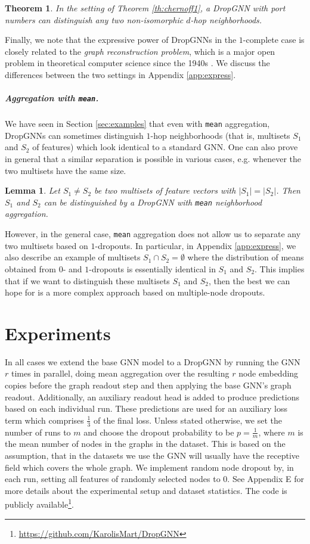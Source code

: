\documentclass{article}
\newtheorem{theorem}{Theorem}
\newtheorem{lemma}{Lemma}
\begin{document}
\begin{theorem} \label{th:ports}
In the setting of Theorem \ref{th:chernoff1}, a DropGNN with port numbers can distinguish any two non-isomorphic $d$-hop neighborhoods.
\end{theorem}

Finally, we note that the expressive power of DropGNNs in the $1$-complete case is closely related to the \textit{graph reconstruction problem}, which is a major open problem in theoretical computer science since the 1940s \citep{reconstruction}. We discuss the differences between the two settings in Appendix \ref{app:express}.

\subparagraph*{Aggregation with \texttt{mean}.} We have seen in Section \ref{sec:examples} that even with \texttt{mean} aggregation, DropGNNs can sometimes distinguish $1$-hop neighborhoods (that is, multisets $S_1$ and $S_2$ of features) which look identical to a standard GNN. One can also prove in general that a similar separation is possible in various cases, e.g. whenever the two multisets have the same size.

\begin{lemma} \label{th:mean}
Let $S_1 \neq S_2$ be two multisets of feature vectors with $|S_1| = |S_2|$. Then $S_1$ and $S_2$ can be distinguished by a DropGNN with \texttt{mean} neighborhood aggregation.
\end{lemma}

However, in the general case, \texttt{mean} aggregation does not allow us to separate any two multisets based on $1$-dropouts. In particular, in Appendix \ref{app:express}, we also describe an example of multisets $S_1 \cap S_2 = \emptyset$ where the distribution of means obtained from $0$- and $1$-dropouts is essentially identical in $S_1$ and $S_2$. This implies that if we want to distinguish these multisets $S_1$ and $S_2$, then the best we can hope for is a more complex approach based on multiple-node dropouts.

\section{Experiments}

In all cases we extend the base GNN model to a DropGNN by running the GNN $r$ times in parallel, doing mean aggregation over the resulting $r$ node embedding copies before the graph readout step and then applying the base GNN's graph readout. Additionally, an auxiliary readout head is added to produce predictions based on each individual run. These predictions are used for an auxiliary loss term which comprises $\frac{1}{3}$ of the final loss. 
Unless stated otherwise, we set the number of runs to $m$ and choose the dropout probability to be $p=\frac{1}{m}$, where $m$ is the mean number of nodes in the graphs in the dataset. This is based on the assumption, that in the datasets we use the GNN will usually have the receptive field which covers the whole graph. We implement random node dropout by, in each run, setting all features of randomly selected nodes to $0$. See Appendix E for more details about the experimental setup and dataset statistics. The code is publicly available\footnote{\url{https://github.com/KarolisMart/DropGNN}}.
\end{document}
